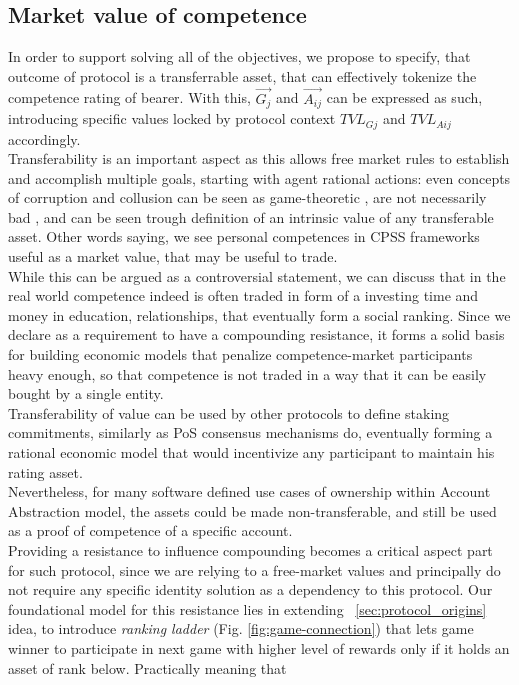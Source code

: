 \documentclass{article}
\begin{document}
\begin{CJK}{UTF8}{gbsn}
\begin{multicols}{2}
        \subsection{Market value of competence}
        \label{sec:market-values}
        In order to support solving all of the objectives, we propose to specify, that outcome of protocol is a transferrable asset, that can effectively tokenize the competence rating of bearer. With this, $\vec{G_j}$ and $\vec{A_{ij}}$ can be expressed as such, introducing specific values locked by protocol context $TVL_{Gj}$ and ${TVL_{Aij}}$ accordingly.\\
        Transferability is an important aspect as this allows free market rules to establish and accomplish multiple goals, starting with agent rational actions: even concepts of corruption and collusion can be seen as game-theoretic \cite{Macrae1982}, are not necessarily bad \cite{Leff1964}, and can be seen trough definition of an intrinsic value of any transferable asset. Other words saying, we see personal competences in CPSS frameworks useful as a market value, that may be useful to trade. \\While this can be argued as a controversial statement, we can discuss that in the real world competence indeed is often traded in form of a investing time and money in education, relationships, that eventually form a social ranking. Since we declare as a requirement to have a compounding resistance, it forms a solid basis for building economic models that penalize competence-market participants heavy enough,  so that competence is not traded in a way that it can be easily bought by a single entity.\\ Transferability of value can be used by other protocols to define staking commitments, similarly as PoS consensus mechanisms do, eventually forming a rational economic model that would incentivize any participant to maintain his rating asset.\\
        Nevertheless, for many software defined use cases of ownership within Account Abstraction\cite{Qin2023} model, the assets could be made non-transferable, and still be used as a proof of competence of a specific account.\\
        Providing a resistance to influence compounding becomes a critical aspect part for such protocol, since we are relying to a free-market values and principally do not require any specific identity solution as a dependency to this protocol.
        Our foundational model for this resistance lies in extending  ~\ref{sec:protocol_origins} idea, to introduce \textit{ranking ladder} (Fig. \ref*{fig:game-connection}) that lets game winner to participate in next game with higher level of rewards only if it holds an asset of rank below. Practically meaning that

\end{multicols}
\end{CJK}
\end{document}
